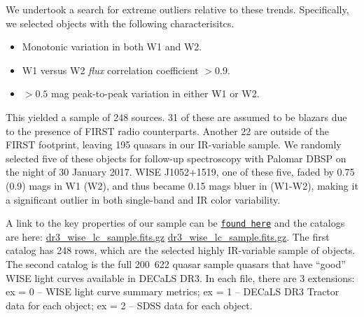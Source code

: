 \documentclass{emulateapj}
\begin{document}
We undertook a search for extreme outliers relative to these trends.
Specifically, we selected objects with the following characterisitcs.

\begin{itemize}
\item Monotonic variation in both W1 and W2.
\item W1 versus W2 \textit{flux} correlation coefficient $>$0.9.
\item $>0.5$ mag peak-to-peak variation in either W1 or W2.
\end{itemize}

This yielded a sample of 248 sources. 31 of these are assumed to be blazars 
due to the presence of FIRST radio counterparts. Another 22 are outside of the 
FIRST  footprint, leaving 195 quasars in our IR-variable sample. We randomly 
selected five of these objects for follow-up spectroscopy with Palomar DBSP on
the night of 30 January 2017. WISE J1052+1519, one of these five, 
faded by 0.75 (0.9) mags in W1 (W2), and thus became 0.15 mags bluer in 
(W1-W2), making it a significant outlier in both single-band and IR color 
variability.

A link to the key properties of our sample can be
\href{http://portal.nersc.gov/project/cosmo/temp/ameisner/qso\_pages\_v01/}
{\tt found here} and the catalogs are here:
\href{http://portal.nersc.gov/project/cosmo/temp/ameisner/dr3_wise_lc_sample.fits.gz}{dr3\_wise\_lc\_sample.fits.gz}
\href{http://portal.nersc.gov/project/cosmo/temp/ameisner/dr3_wise_lc_metrics_all_qso.fits.gz}{dr3\_wise\_lc\_sample.fits.gz}.
The first catalog has 248 rows, which are the selected highly
IR-variable sample of objects.  The second catalog is the full
\hbox{200 622} quasar sample quasars that have ``good'' WISE light
curves available in DECaLS DR3. In each file, there are 3 extensions:
ex = 0 -- WISE light curve summary metrics; ex = 1 -- DECaLS DR3
Tractor data for each object; ex = 2 -- SDSS data for each object.
\end{document}
